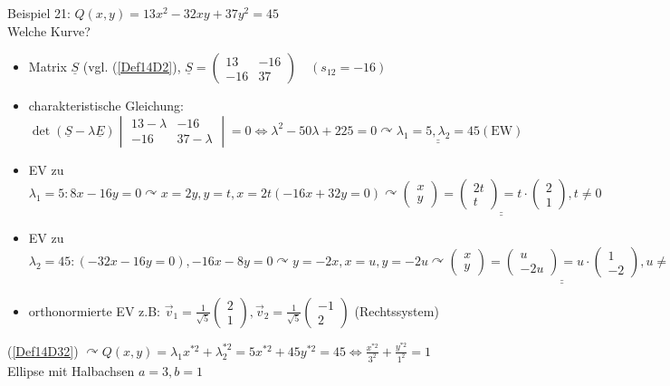 \documentclass[a4paper]{scrartcl}
\begin{document}
Beispiel 21: $Q(x,y) = 13x^2 - 32xy + 37y^2 = 45$\\
Welche Kurve?
\begin{itemize}
\item Matrix $\underline{S}$ (vgl. (\ref{Def14D2}), $\underline{S}= \begin{pmatrix} 13 & -16 \\ -16 & 37 \end{pmatrix} \quad ( s_{12} = -16 )$
\item charakteristische Gleichung: $\det{(\underline{S} - \lambda \underline{E})} \begin{vmatrix} 13-\lambda & -16 \\ -16 & 37 - \lambda \end{vmatrix} = 0 \Leftrightarrow \lambda^2 - 50 \lambda + 225 = 0 \curvearrowright \underline{\underline{\lambda_1 = 5, \lambda_2 = 45}} (\text{EW})$
\item EV zu $\lambda_1=5: 8x - 16y = 0 \curvearrowright x = 2y, y=t, x=2t (-16x + 32y = 0) \curvearrowright \underline{\underline{\begin{pmatrix} x \\y \end{pmatrix} = \begin{pmatrix} 2t \\ t \end{pmatrix} = t \cdot \begin{pmatrix} 2 \\ 1 \end{pmatrix}, t \neq 0 }}$
\item EV zu $\lambda_2 = 45: (-32x -16y = 0 ), -16x -8y = 0 \curvearrowright y=-2x, x=u, y= -2u \curvearrowright \underline{\underline{ \begin{pmatrix} x \\y \end{pmatrix} = \begin{pmatrix} u \\ -2u \end{pmatrix} = u \cdot \begin{pmatrix} 1 \\ -2 \end{pmatrix}, u \neq 0}}$
\item orthonormierte EV z.B: $\vec{v}_1 = \frac{1}{\sqrt{5}} \begin{pmatrix} 2 \\ 1 \end{pmatrix}, \vec{v}_2 = \frac{1}{\sqrt{5}} \begin{pmatrix}-1\\2\end{pmatrix}$ (Rechtssystem)
\end{itemize}
(\ref{Def14D32}) $\curvearrowright Q(x,y)= \lambda_1 x^{*2} + \lambda_2^{*2} = 5 x^{*2} + 45 y^{*2} = 45 \Leftrightarrow \frac{x^{*2}}{3^2} + \frac{y^{*2}}{1^2} =1$ Ellipse mit Halbachsen $a=3,b=1$
\end{document}

